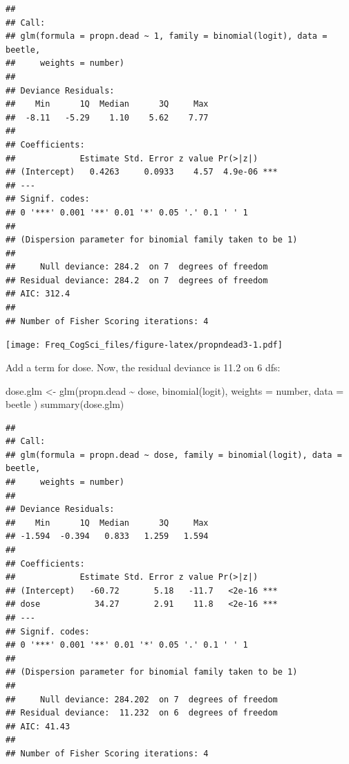 \documentclass[
  12pt,
]{krantz}
\newenvironment{Shaded}{\begin{snugshade}}{\end{snugshade}}
\newcommand{\AttributeTok}[1]{\textcolor[rgb]{0.77,0.63,0.00}{#1}}
\newcommand{\DecValTok}[1]{\textcolor[rgb]{0.00,0.00,0.81}{#1}}
\newcommand{\FunctionTok}[1]{\textcolor[rgb]{0.00,0.00,0.00}{#1}}
\newcommand{\NormalTok}[1]{#1}
\newcommand{\OtherTok}[1]{\textcolor[rgb]{0.56,0.35,0.01}{#1}}
\newcommand{\SpecialCharTok}[1]{\textcolor[rgb]{0.00,0.00,0.00}{#1}}
\newcommand{\StringTok}[1]{\textcolor[rgb]{0.31,0.60,0.02}{#1}}
\theoremstyle{definition}
\theoremstyle{definition}
\theoremstyle{definition}
\theoremstyle{definition}
\theoremstyle{remark}
\begin{document}
\begin{verbatim}
## 
## Call:
## glm(formula = propn.dead ~ 1, family = binomial(logit), data = beetle, 
##     weights = number)
## 
## Deviance Residuals: 
##    Min      1Q  Median      3Q     Max  
##  -8.11   -5.29    1.10    5.62    7.77  
## 
## Coefficients:
##             Estimate Std. Error z value Pr(>|z|)    
## (Intercept)   0.4263     0.0933    4.57  4.9e-06 ***
## ---
## Signif. codes:  
## 0 '***' 0.001 '**' 0.01 '*' 0.05 '.' 0.1 ' ' 1
## 
## (Dispersion parameter for binomial family taken to be 1)
## 
##     Null deviance: 284.2  on 7  degrees of freedom
## Residual deviance: 284.2  on 7  degrees of freedom
## AIC: 312.4
## 
## Number of Fisher Scoring iterations: 4
\end{verbatim}

\begin{Shaded}
\end{Shaded}

\texttt{[image: Freq\_CogSci\_files/figure-latex/propndead3-1.pdf]}

Add a term for dose. Now, the residual deviance is 11.2 on 6 dfs:

\begin{Shaded}
\begin{Highlighting}[]
\NormalTok{dose.glm }\OtherTok{\textless{}{-}} \FunctionTok{glm}\NormalTok{(propn.dead }\SpecialCharTok{\textasciitilde{}}\NormalTok{ dose, }\FunctionTok{binomial}\NormalTok{(logit),}
  \AttributeTok{weights =}\NormalTok{ number, }\AttributeTok{data =}\NormalTok{ beetle}
\NormalTok{)}
\FunctionTok{summary}\NormalTok{(dose.glm)}
\end{Highlighting}
\end{Shaded}

\begin{verbatim}
## 
## Call:
## glm(formula = propn.dead ~ dose, family = binomial(logit), data = beetle, 
##     weights = number)
## 
## Deviance Residuals: 
##    Min      1Q  Median      3Q     Max  
## -1.594  -0.394   0.833   1.259   1.594  
## 
## Coefficients:
##             Estimate Std. Error z value Pr(>|z|)    
## (Intercept)   -60.72       5.18   -11.7   <2e-16 ***
## dose           34.27       2.91    11.8   <2e-16 ***
## ---
## Signif. codes:  
## 0 '***' 0.001 '**' 0.01 '*' 0.05 '.' 0.1 ' ' 1
## 
## (Dispersion parameter for binomial family taken to be 1)
## 
##     Null deviance: 284.202  on 7  degrees of freedom
## Residual deviance:  11.232  on 6  degrees of freedom
## AIC: 41.43
## 
## Number of Fisher Scoring iterations: 4
\end{verbatim}
\end{document}
